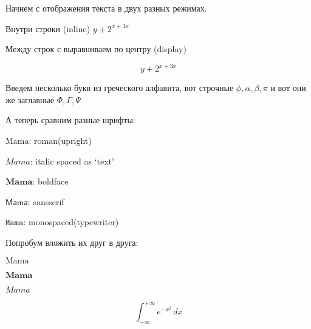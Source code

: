 \documentclass[a4paper, leqno]{article}
\begin{document}
Начнем с отображения текста в двух разных режимах.

Внутри строки (inline) $y+2^{x+3x}$

Между строк с выравниваем по центру (display)

\[
y+2^{x+3x}
\]

Введем несколько букв из греческого алфавита, вот строчные  $\phi, \alpha, \beta, \pi$ и вот они же заглавные $\Phi, \Gamma, \Psi$

А теперь сравним разные шрифты:

$\mathrm{Mama}$: roman(upright)

$\mathit{Mama}$: italic spaced as ‘text’

$\mathbf{Mama}$: boldface

$\mathsf{Mama}$: sansserif

$\mathtt{Mama}$: monospaced(typewriter)

Попробум вложить их друг в друга:

$\mathbf{\mathrm{Mama}}$

$\mathsf{\mathbf{Mama}}$

$\mathbf{\mathit{Mama}}$

\begin{equation}
 \int_{-\infty}^{+\infty} e^{-x^2} \, dx
 \end{equation}
\end{document}
